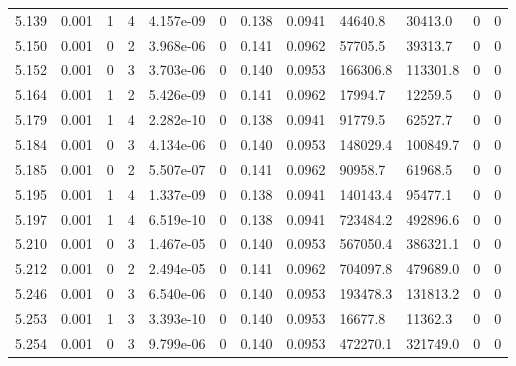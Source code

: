 \documentclass[preview]{standalone}
\begin{document}
{{{{{{{\begin{tabular}{L{1.2cm}C{1.2cm} C{0.3cm}C{0.5cm} C{1.4cm}C{1.4cm} C{1.4cm}C{1.4cm} C{1.6cm}C{1.6cm} C{1.6cm}C{1.6cm}}
  5.139  &  0.001  & 1     &  4 &  4.157e-09  & 0  &  0.138&   0.0941& 44640.8 & 30413.0   &  0 & 0  \\ 
  5.150  &  0.001  & 0     &  2 &  3.968e-06  & 0  &  0.141&   0.0962& 57705.5 & 39313.7   &  0 & 0  \\ 
  5.152  &  0.001  & 0     &  3 &  3.703e-06  & 0  &  0.140&   0.0953& 166306.8 & 113301.8   &  0 & 0  \\ 
  5.164  &  0.001  & 1     &  2 &  5.426e-09  & 0  &  0.141&   0.0962& 17994.7 & 12259.5   &  0 & 0  \\ 
  5.179  &  0.001  & 1     &  4 &  2.282e-10  & 0  &  0.138&   0.0941& 91779.5 & 62527.7   &  0 & 0  \\ 
  5.184  &  0.001  & 0     &  3 &  4.134e-06  & 0  &  0.140&   0.0953& 148029.4 & 100849.7   &  0 & 0  \\ 
  5.185  &  0.001  & 0     &  2 &  5.507e-07  & 0  &  0.141&   0.0962& 90958.7 & 61968.5   &  0 & 0  \\ 
  5.195  &  0.001  & 1     &  4 &  1.337e-09  & 0  &  0.138&   0.0941& 140143.4 & 95477.1   &  0 & 0  \\ 
  5.197  &  0.001  & 1     &  4 &  6.519e-10  & 0  &  0.138&   0.0941& 723484.2 & 492896.6   &  0 & 0  \\ 
  5.210  &  0.001  & 0     &  3 &  1.467e-05  & 0  &  0.140&   0.0953& 567050.4 & 386321.1   &  0 & 0  \\ 
  5.212  &  0.001  & 0     &  2 &  2.494e-05  & 0  &  0.141&   0.0962& 704097.8 & 479689.0   &  0 & 0  \\ 
  5.246  &  0.001  & 0     &  3 &  6.540e-06  & 0  &  0.140&   0.0953& 193478.3 & 131813.2   &  0 & 0  \\ 
  5.253  &  0.001  & 1     &  3 &  3.393e-10  & 0  &  0.140&   0.0953& 16677.8 & 11362.3   &  0 & 0  \\ 
  5.254  &  0.001  & 0     &  3 &  9.799e-06  & 0  &  0.140&   0.0953& 472270.1 & 321749.0   &  0 & 0  \\ 
\hline 
\end{tabular} 

}}}}}}}
\end{document}
